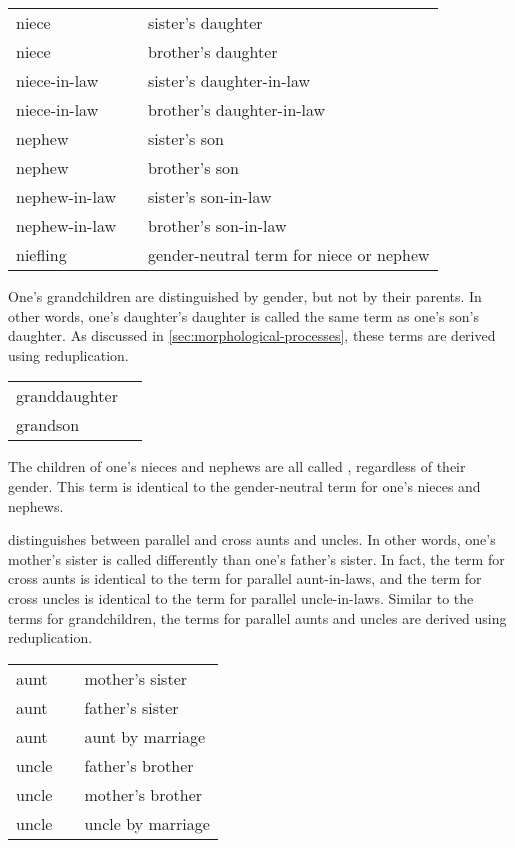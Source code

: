 \exdisplay\noexno
	\begin{tabu} {l l l}
		niece &  & sister's daughter\\
		niece &  & brother's daughter\\
		niece-in-law &  & sister's daughter-in-law\\
		niece-in-law &  & brother's daughter-in-law\\
		nephew &  & sister's son\\
		nephew &  & brother's son\\
		nephew-in-law &  & sister's son-in-law\\
		nephew-in-law &  & brother's son-in-law\\
		niefling &  & gender-neutral term for niece or nephew\\
	\end{tabu}
\xe

One's grandchildren are distinguished by gender, but not by their parents. In other words, one's daughter's daughter is called the same term as one's son's daughter. As discussed in \autoref{sec:morphological-processes}, these terms are derived using reduplication.

\exdisplay\noexno
	\begin{tabu} {l l}
		granddaughter & \\
		grandson & \\
	\end{tabu}
\xe

The children of one's nieces and nephews are all called , regardless of their gender. This term is identical to the gender-neutral term for one's nieces and nephews.

\langtvk{} distinguishes between parallel and cross aunts and uncles. In other words, one's mother's sister is called differently than one's father's sister. In fact, the term for cross aunts is identical to the term for parallel aunt-in-laws, and the term for cross uncles is identical to the term for parallel uncle-in-laws. Similar to the terms for grandchildren, the terms for parallel aunts and uncles are derived using reduplication.

\exdisplay\noexno
	\begin{tabu} {l l l}
		aunt &  & mother's sister\\
		aunt &  & father's sister\\
		aunt &  & aunt by marriage\\
		uncle &  & father's brother\\
		uncle &  & mother's brother\\
		uncle &  & uncle by marriage\\
	\end{tabu}
\xe

